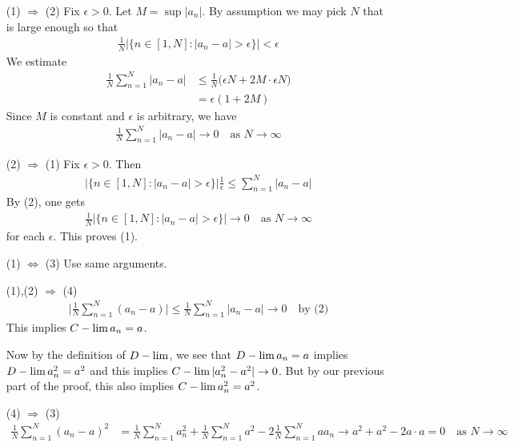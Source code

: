 \documentclass[10pt,a4paper]{report}
\newenvironment{proof}
{\begin{changemargin}{1cm}{0.5cm} 
	}%
	{\end{changemargin}
}
\begin{document}
\begin{proof}
\pf \begin{itemize}
\item[(1) $\Rightarrow$ (2)] Fix $\epsilon >0$. Let $M = \sup |a_n|$. By assumption we may pick $N$ that is large enough so that
\begin{align*}
\frac{1}{N} \big| \{n\in [1,N] : |a_n -a| >\epsilon \} \big| < \epsilon
\end{align*}
We estimate
\begin{align*}
\frac{1}{N} \sum_{n=1}^N |a_n -a| &\leq \frac{1}{N} \Big( \epsilon N + 2M \cdot \epsilon N \Big)\\
&= \epsilon (1+2M)
\end{align*}
Since $M$ is constant and $\epsilon$ is arbitrary, we have
\begin{align*}
\frac{1}{N} \sum_{n=1}^N |a_n -a| \rightarrow 0 \quad \text{as } N\rightarrow \infty
\end{align*}
\item[(2) $\Rightarrow$ (1)] Fix $\epsilon >0$. Then \begin{align*}
\Big| \{n \in [1,N] : |a_n -a| > \epsilon  \} \Big| \frac{1}{\epsilon}\leq \sum_{n=1}^N |a_n-a|
\end{align*}
By (2), one gets
\begin{align*}
\frac{1}{N}|\{n\in [1,N] : |a_n -a| >\epsilon \}| \rightarrow 0 \quad \text{as } N\rightarrow \infty
\end{align*}
for each $\epsilon$. This proves (1).
\item[(1) $\Leftrightarrow$ (3)] Use same arguments. 
\item[(1),(2) $\Rightarrow$ (4)] \begin{align*}
\Big| \frac{1}{N} \sum_{n=1}^N (a_n -a) \Big| \leq \frac{1}{N}\sum_{n=1}^N |a_n -a| \rightarrow 0 \quad \text{by (2)}
\end{align*}
This implies $C-\lim a_n =a$.

\quad Now by the definition of $D-\lim$, we see that $D-\lim a_n = a$ implies $D-\lim a^2_n =a^2$ and this implies $C-\lim |a_n^2 -a^2| \rightarrow 0$. But by our previous part of the proof, this also implies $C-\lim a_n^2 =a^2$.
\item[(4) $\Rightarrow$ (3)] \begin{align*}
\frac{1}{N} \sum_{n=1}^N (a_n -a)^2 &= \frac{1}{N} \sum_{n=1}^N a^2_n + \frac{1}{N} \sum_{n=1}^N a^2 - 2\frac{1}{N}\sum_{n=1}^N a a_n \rightarrow a^2 + a^2 - 2a \cdot a =0 \quad \text{as } N\rightarrow \infty
\end{align*}
\end{itemize}

\eop
\end{proof}
\s
\end{document}
